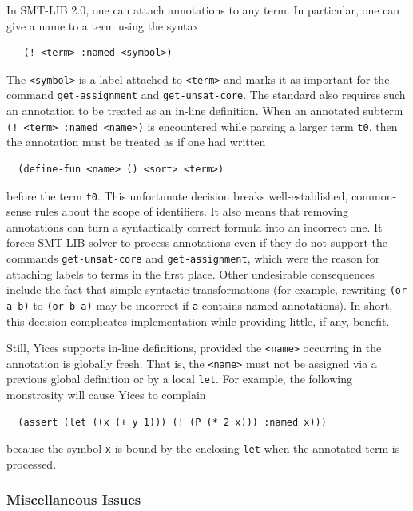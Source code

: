 \documentclass[11pt,twoside,fleqn,openright,titlepage]{cslreport}
\begin{document}
In SMT-LIB 2.0, one can attach annotations to any term. In particular,
one can give a name to a term using the syntax
\begin{small}
\begin{verbatim}
   (! <term> :named <symbol>)
\end{verbatim}
\end{small}
The \texttt{<symbol>} is a label attached to \texttt{<term>} and marks
it as important for the command \texttt{get-assignment} and
\texttt{get-unsat-core}.  The standard also requires such an
annotation to be treated as an in-line definition. When an annotated
subterm \texttt{(! <term> :named <name>)} is encountered while parsing
a larger term \texttt{t0}, then the annotation must be treated as if
one had written
\begin{small}
\begin{verbatim}
  (define-fun <name> () <sort> <term>)
\end{verbatim}
\end{small}
before the term \texttt{t0}. This unfortunate decision breaks
well-established, common-sense rules about the scope of
identifiers. It also means that removing annotations can turn a
syntactically correct formula into an incorrect one. It forces SMT-LIB
solver to process annotations even if they do not support the commands
\texttt{get-unsat-core} and \texttt{get-assignment}, which were the
reason for attaching labels to terms in the first place.  Other
undesirable consequences include the fact that simple syntactic
transformations (for example, rewriting \texttt{(or a b)} to
\texttt{(or b a)} may be incorrect if \texttt{a} contains named
annotations).  In short, this decision complicates implementation
while providing little, if any, benefit.

\medskip\noindent Still, Yices supports in-line definitions, provided
the \texttt{<name>} occurring in the annotation is globally fresh. That
is, the \texttt{<name>} must not be assigned via a previous global
definition or by a local \texttt{let}.  For example, the following
monstrosity will cause Yices to complain
\begin{small}
\begin{verbatim}
  (assert (let ((x (+ y 1))) (! (P (* 2 x))) :named x)))
\end{verbatim}
\end{small}
because the symbol \texttt{x} is bound by the enclosing \texttt{let}
when the annotated term is processed.


\subsubsection*{Miscellaneous Issues}
\end{document}
